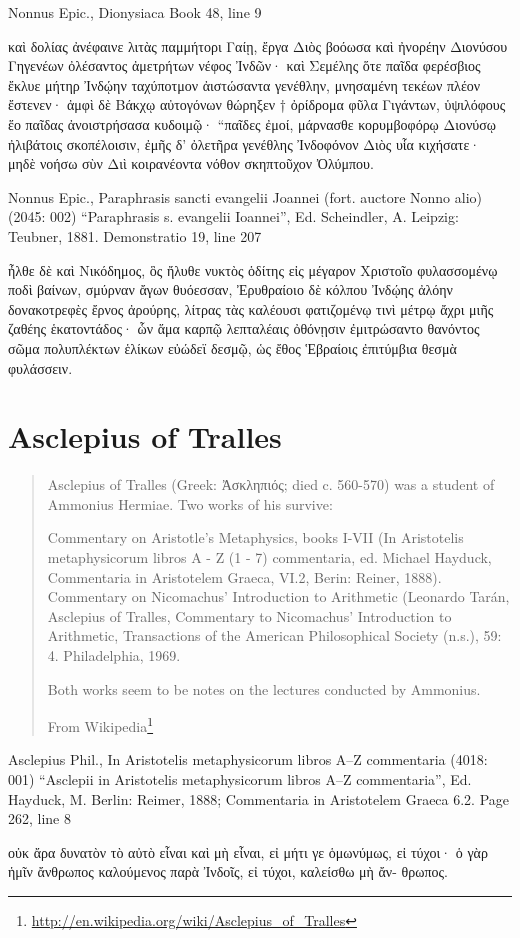 \documentclass[12pt,letterpaper,twoside,final]{memoir}
\begin{document}
\begin{greek}
Nonnus Epic., Dionysiaca 
Book 48, line 9

καὶ δολίας ἀνέφαινε λιτὰς παμμήτορι Γαίῃ, 
ἔργα Διὸς βοόωσα καὶ ἠνορέην Διονύσου 
Γηγενέων ὀλέσαντος ἀμετρήτων νέφος Ἰνδῶν· 
καὶ Σεμέλης ὅτε παῖδα φερέσβιος ἔκλυε μήτηρ 
Ἰνδῴην ταχύποτμον ἀιστώσαντα γενέθλην, 
μνησαμένη τεκέων πλέον ἔστενεν· ἀμφὶ δὲ Βάκχῳ 
αὐτογόνων θώρηξεν † ὀρίδρομα φῦλα Γιγάντων, 
ὑψιλόφους ἕο παῖδας ἀνοιστρήσασα κυδοιμῷ· 
 “παῖδες ἐμοί, μάρνασθε κορυμβοφόρῳ Διονύσῳ 
ἠλιβάτοις σκοπέλοισιν, ἐμῆς δ' ὀλετῆρα γενέθλης 
Ἰνδοφόνον Διὸς υἷα κιχήσατε· μηδὲ νοήσω   
σὺν Διὶ κοιρανέοντα νόθον σκηπτοῦχον Ὀλύμπου. 



Nonnus Epic., Paraphrasis sancti evangelii Joannei (fort. auctore Nonno alio) (2045: 002)
“Paraphrasis s. evangelii Ioannei”, Ed. Scheindler, A.
Leipzig: Teubner, 1881.
Demonstratio 19, line 207

ἦλθε δὲ καὶ Νικόδημος, ὃς ἤλυθε νυκτὸς ὁδίτης 
εἰς μέγαρον Χριστοῖο φυλασσομένῳ ποδὶ βαίνων, 
σμύρναν ἄγων θυόεσσαν, Ἐρυθραίοιο δὲ κόλπου 
Ἰνδῴης ἀλόην δονακοτρεφὲς ἔρνος ἀρούρης, 
λίτρας τὰς καλέουσι φατιζομένῳ τινὶ μέτρῳ 
ἄχρι μιῆς ζαθέης ἑκατοντάδος· ὧν ἅμα καρπῷ 
λεπταλέαις ὀθόνῃσιν ἐμιτρώσαντο θανόντος 
σῶμα πολυπλέκτων ἑλίκων εὐώδεϊ δεσμῷ, 
ὡς ἔθος Ἑβραίοις ἐπιτύμβια θεσμὰ φυλάσσειν. 

\end{greek}

\section{Asclepius of Tralles}
\blockquote[From Wikipedia\footnote{\url{http://en.wikipedia.org/wiki/Asclepius_of_Tralles}}]{

Asclepius of Tralles (Greek: Ἀσκληπιός; died c. 560-570) was a student of Ammonius Hermiae. Two works of his survive:

    Commentary on Aristotle's Metaphysics, books I-VII (In Aristotelis metaphysicorum libros Α - Ζ (1 - 7) commentaria, ed. Michael Hayduck, Commentaria in Aristotelem Graeca, VI.2, Berin: Reiner, 1888).
    Commentary on Nicomachus' Introduction to Arithmetic (Leonardo Tarán, Asclepius of Tralles, Commentary to Nicomachus' Introduction to Arithmetic, Transactions of the American Philosophical Society (n.s.), 59: 4. Philadelphia, 1969.

Both works seem to be notes on the lectures conducted by Ammonius.
}
\begin{greek}

Asclepius Phil., In Aristotelis metaphysicorum libros A–Z commentaria (4018: 001)
“Asclepii in Aristotelis metaphysicorum libros A–Z commentaria”, Ed. Hayduck, M.
Berlin: Reimer, 1888; Commentaria in Aristotelem Graeca 6.2.
Page 262, line 8

                                                                             οὐκ ἄρα 
δυνατὸν τὸ αὐτὸ εἶναι καὶ μὴ εἶναι, εἰ μήτι γε ὁμωνύμως, εἰ τύχοι· ὁ 
γὰρ ἡμῖν ἄνθρωπος καλούμενος παρὰ Ἰνδοῖς, εἰ τύχοι, καλείσθω μὴ ἄν-
θρωπος. 

\end{greek}
\end{document}

